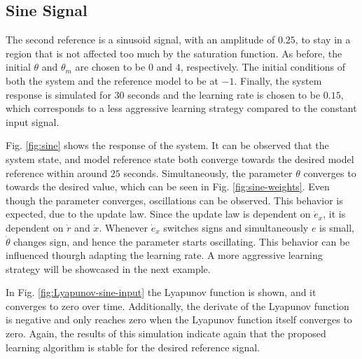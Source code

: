\subsection{Sine Signal}
The second reference is a sinusoid signal, with an amplitude of $0.25$, to stay in a region that is not affected too much by the saturation function. As before, the initial $\theta$ and $\theta_m$ are chosen to be $0$ and $4$, respectively. The initial conditions of both the system and the reference model to be at $-1$. Finally, the system response is simulated for $30$ seconds and the learning rate is chosen to be $0.15$, which corresponds to a less aggressive learning strategy compared to the constant input signal.

Fig. \ref{fig:sine} shows the response of the system. It can be observed that the system state, and model reference state both converge towards the desired model reference within around $25$ seconds. Simultaneously, the parameter $\theta$ converges to towards the desired value, which can be seen in Fig. \ref{fig:sine-weights}. Even though the parameter converges, oscillations can be observed. This behavior is expected, due to the update law. Since the update law is dependent on $\dot e_x$, it is dependent on $\dot r$ and $\dot x$. Whenever $\dot e_x$ switches signs and simultaneously $e$ is small, $\dot \theta$ changes sign, and hence the parameter starts oscillating. This behavior can be influenced thourgh adapting the learning rate. A more aggressive learning strategy will be showcased in the next example.

In Fig. \ref{fig:Lyapunov-sine-input} the Lyapunov function is shown, and it converges to zero over time. Additionally, the derivate of the Lyapunov function is negative and only reaches zero when the Lyapunov function itself converges to zero. Again, the results of this simulation indicate again that the proposed learning algorithm is stable for the desired reference signal.

